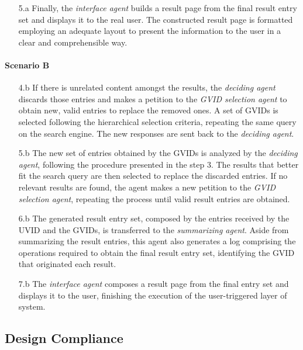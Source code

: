 \begin{enumerate}
\begin{enumerate}
        \item [5.a] Finally, the \textit{interface agent} builds a result page from the final result entry set and displays it to the real user. The constructed result page is formatted employing an adequate layout to present the information to the user in a clear and comprehensible way.
    \end{enumerate}
    
    \paragraph{Scenario B}
    \begin{enumerate}
        \item [4.b] If there is unrelated content amongst the results, the \textit{deciding agent} discards those entries and makes a petition to the \textit{GVID selection agent} to obtain new, valid entries to replace the removed ones. A set of GVIDs is selected following the hierarchical selection criteria, repeating the same query on the search engine. The new responses are sent back to the \textit{deciding agent}.
        
        \item[5.b] The new set of entries obtained by the GVIDs is analyzed by the \textit{deciding agent}, following the procedure presented in the step 3. The results that better fit the search query are then selected to replace the discarded entries. If no relevant results are found, the agent makes a new petition to the \textit{GVID selection agent}, repeating the process until valid result entries are obtained.
        
        \item [6.b] The generated result entry set, composed by the entries received by the UVID and the GVIDs, is transferred to the \textit{summarizing agent}. Aside from summarizing the result entries, this agent also generates a log comprising the operations required to obtain the final result entry set, identifying the GVID that originated each result.
        
        \item [7.b] The \textit{interface agent} composes a result page from the final entry set and displays it to the user, finishing the execution of the user-triggered layer of system.
    \end{enumerate}
\end{enumerate}

\subsection{Design Compliance}\label{6_sec:subsec:design_compliance}

